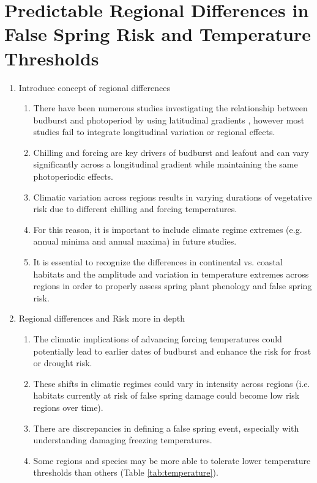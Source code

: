\documentclass{article}\usepackage[]{graphicx}\usepackage[]{color}
\begin{document}
\section*{Predictable Regional Differences in False Spring Risk and Temperature Thresholds}
\begin{enumerate}
\item Introduce concept of regional differences
\begin {enumerate}
\item There have been numerous studies investigating the relationship between budburst and photoperiod by using latitudinal gradients \citep{Partanen2004, Viheraaarnio2006, Caffarra2011, Zohner2016, Gauzere2017}, however most studies fail to integrate longitudinal variation or regional effects.
\item Chilling and forcing are key drivers of budburst and leafout and can vary significantly across a  longitudinal gradient while maintaining the same photoperiodic effects. %
\item Climatic variation across regions results in varying durations of vegetative risk due to different chilling and forcing temperatures.
\item For this reason, it is important to include climate regime extremes (e.g. annual minima and annual maxima) in future studies.
\item It is essential to recognize the differences in continental vs. coastal habitats and the amplitude and variation in temperature extremes across regions in order to properly assess spring plant phenology and false spring risk.
\end{enumerate}
\item Regional differences and Risk more in depth
\begin{enumerate}
\item The climatic implications of advancing forcing temperatures could potentially lead to earlier dates of budburst and enhance the risk for frost or drought risk.
\item These shifts in climatic regimes could vary in intensity across regions (i.e. habitats currently at risk of false spring damage could become low risk regions over time). 
\item There are discrepancies in defining a false spring event, especially with understanding damaging freezing temperatures.
\item Some regions and species may be more able to tolerate lower temperature thresholds than others (Table \ref{tab:temperature}).

\end{enumerate}
\end{enumerate}
\end{document}
